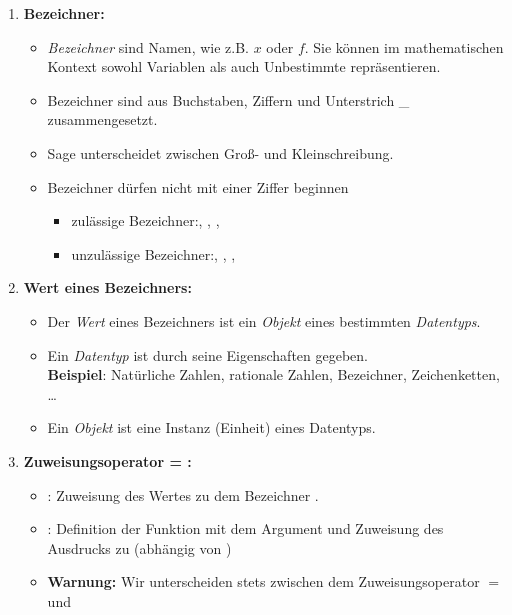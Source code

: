 \documentclass[fontsize=12pt,paper=a4,twoside,bibtotoc,idxtotoc,
liststotoc,pagesize,BCOR1.2cm,DIV15,chapterprefix,pagesize=pdftex]{scrbook}
\begin{document}
\begin{enumerate}
  \item \textbf{Bezeichner:}
    \begin{itemize}
    \item \emph{Bezeichner} sind Namen, wie z.B. $x$ oder $f$. Sie können
    im mathematischen Kontext sowohl Variablen als auch Unbestimmte repräsentieren.
    \item Bezeichner sind aus Buchstaben, Ziffern und
    Unterstrich \_ zusammengesetzt.
    \item Sage unterscheidet zwischen Groß- und Kleinschreibung.
    \item Bezeichner dürfen nicht mit einer Ziffer beginnen
    \begin{itemize}
    \item zulässige Bezeichner:, , , 
    \item unzulässige Bezeichner:, , , 
    \end{itemize}
  \end{itemize}
  \item\textbf{Wert eines Bezeichners:}
    \begin{itemize}
    \item Der \emph{Wert} eines Bezeichners  ist ein \emph{Objekt} eines bestimmten
    \emph{Datentyps}.
    \item Ein \emph{Datentyp} ist durch seine Eigenschaften gegeben. \\
    \textbf{Beispiel}: Natürliche Zahlen, rationale Zahlen, Bezeichner, Zeichenketten, \ldots  
    \item Ein \emph{Objekt} ist eine Instanz (Einheit) eines Datentyps.
    \end{itemize}
  \item \textbf{Zuweisungsoperator = :}
    \begin{itemize}
    \item {\color{blue} }: Zuweisung des Wertes  zu dem Bezeichner .
    \item {\color{blue} }: Definition der Funktion  mit dem Argument  und Zuweisung des Ausdrucks  zu (abhängig von )
    \item \textbf{Warnung:} Wir unterscheiden stets zwischen dem Zuweisungsoperator {\color{blue} $=$} und

\end{itemize}
\end{enumerate}
\end{document}
